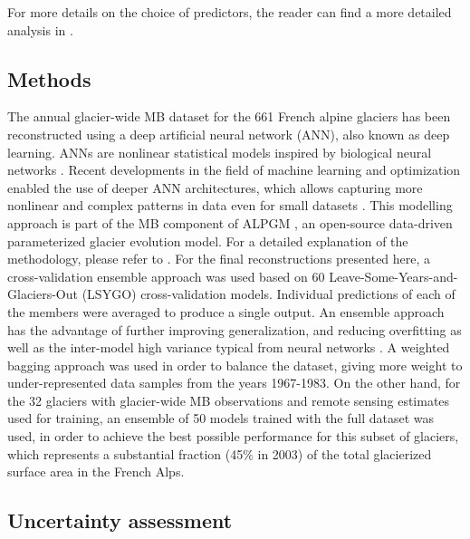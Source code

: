 For more details on the choice of predictors, the reader can find a more detailed analysis in \citet{bolibar_deep_2020-1}.

\subsection{Methods} \label{past:methods:methods}

The annual glacier-wide MB dataset for the 661 French alpine glaciers has been reconstructed using a deep artificial neural network (ANN), also known as deep learning. ANNs are nonlinear statistical models inspired by biological neural networks \citep{fausett_fundamentals_1994, hastie_elements_2009}. Recent developments in the field of machine learning and optimization enabled the use of deeper ANN architectures, which allows capturing more nonlinear and complex patterns in data even for small datasets \citep{ingrassia_neural_2005}.  This modelling approach is part of the MB component of ALPGM \citep{bolibar_alpgm_2020}, an open-source data-driven parameterized glacier evolution model. For a detailed explanation of the methodology, please refer to \citet{bolibar_deep_2020-1}. For the final reconstructions presented here, a cross-validation ensemble approach was used based on 60 Leave-Some-Years-and-Glaciers-Out (LSYGO) cross-validation models. Individual predictions of each of the  members were averaged to produce a single output. An ensemble approach has the advantage of further improving generalization, and reducing overfitting as well as the inter-model high variance typical from neural networks \citep{krogh_neural_1995}. A weighted bagging approach \citep{hastie_elements_2009} was used in order to balance the dataset, giving more weight to under-represented data samples from the years 1967-1983. On the other hand, for the 32 glaciers with glacier-wide MB observations and remote sensing estimates used for training, an ensemble of 50 models trained with the full dataset was used, in order to achieve the best possible performance for this subset of glaciers, which represents a substantial fraction (45\% in 2003) of the total glacierized surface area in the French Alps.

\subsection{Uncertainty assessment} \label{past:methods:uncertainty}

